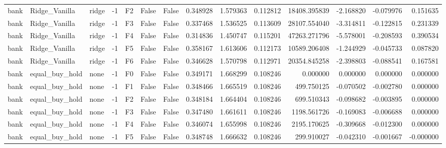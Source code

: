 \begin{tabular}{lllrlllrrrrrrr}
      bank &  Ridge\_Vanilla &     ridge &    -1 &  F2 &           False &            False &  0.348928 &  1.579363 & 0.112812 &     18408.395839 &          -2.168820 &       -0.079976 &            0.151635 \\
      bank &  Ridge\_Vanilla &     ridge &    -1 &  F3 &           False &            False &  0.337468 &  1.536525 & 0.113609 &     28107.554040 &          -3.314811 &       -0.122815 &            0.231339 \\
      bank &  Ridge\_Vanilla &     ridge &    -1 &  F4 &           False &            False &  0.314836 &  1.450747 & 0.115201 &     47263.271796 &          -5.578001 &       -0.208593 &            0.390534 \\
      bank &  Ridge\_Vanilla &     ridge &    -1 &  F5 &           False &            False &  0.358167 &  1.613606 & 0.112173 &     10589.206408 &          -1.244929 &       -0.045733 &            0.087820 \\
      bank &  Ridge\_Vanilla &     ridge &    -1 &  F6 &           False &            False &  0.346628 &  1.570798 & 0.112971 &     20354.845258 &          -2.398803 &       -0.088541 &            0.167581 \\
      bank & equal\_buy\_hold &      none &    -1 &  F0 &           False &            False &  0.349171 &  1.668299 & 0.108246 &         0.000000 &           0.000000 &        0.000000 &            0.000000 \\
      bank & equal\_buy\_hold &      none &    -1 &  F1 &           False &            False &  0.348466 &  1.665519 & 0.108246 &       499.750125 &          -0.070502 &       -0.002780 &            0.000000 \\
      bank & equal\_buy\_hold &      none &    -1 &  F2 &           False &            False &  0.348184 &  1.664404 & 0.108246 &       699.510343 &          -0.098682 &       -0.003895 &            0.000000 \\
      bank & equal\_buy\_hold &      none &    -1 &  F3 &           False &            False &  0.347480 &  1.661611 & 0.108246 &      1198.561726 &          -0.169083 &       -0.006688 &            0.000000 \\
      bank & equal\_buy\_hold &      none &    -1 &  F4 &           False &            False &  0.346074 &  1.655998 & 0.108246 &      2195.170625 &          -0.309668 &       -0.012300 &            0.000000 \\
      bank & equal\_buy\_hold &      none &    -1 &  F5 &           False &            False &  0.348748 &  1.666632 & 0.108246 &       299.910027 &          -0.042310 &       -0.001667 &           -0.000000 \\

\end{tabular}
